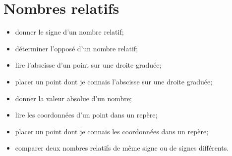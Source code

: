 \chapter{Nombres relatifs}\label{ChNbRelatifs}
\begin{acquis}
\begin{itemize}
\item donner le signe d'un nombre relatif;
\item déterminer l'opposé d'un nombre relatif;
\item lire l'abscisse d'un point sur une droite graduée;
\item placer un point dont je connais l'abscisse sur une droite graduée;
\item donner la valeur absolue d'un nombre;
\item lire les coordonnées d'un point dans un repère;
\item placer un point dont je connais les coordonnées dans un repère;
\item comparer deux nombres relatifs de même signe ou de signes différents.
\end{itemize}
\end{acquis}

\activites



\cours


\exercicesbase
\begin{colonne*exercice}

\end{colonne*exercice}


\exercicesappr
\begin{colonne*exercice}

\end{colonne*exercice}

\connaissances


\TravauxPratiques %


\pagebreak

\recreation



